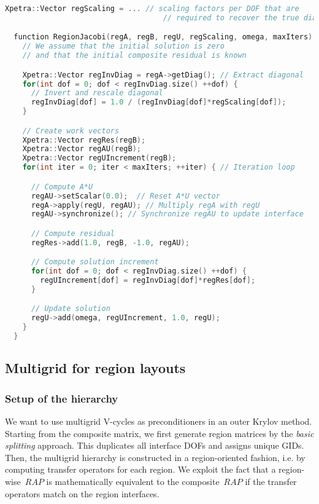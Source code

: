 \documentclass[11pt]{article}
\begin{document}
\begin{lstlisting}[language=c++]
	Xpetra::Vector regScaling = ... // scaling factors per DOF that are
	                                // required to recover the true diagonal

  function RegionJacobi(regA, regB, regU, regScaling, omega, maxIters) {
    // We assume that the initial solution is zero
    // and that the initial composite residual is known

    Xpetra::Vector regInvDiag = regA->getDiag(); // Extract diagonal
    for(int dof = 0; dof < regInvDiag.size() ++dof) {
      // Invert and rescale diagonal
      regInvDiag[dof] = 1.0 / (regInvDiag[dof]*regScaling[dof]);
    }

    // Create work vectors
    Xpetra::Vector regRes(regB);
    Xpetra::Vector regAU(regB);
    Xpetra::Vector regUIncrement(regB);
    for(int iter = 0; iter < maxIters; ++iter) { // Iteration loop

      // Compute A*U
      regAU->setScalar(0.0);  // Reset A*U vector
      regA->apply(regU, regAU); // Multiply regA with regU
      regAU->synchronize(); // Synchronize regAU to update interface

      // Compute residual
      regRes->add(1.0, regB, -1.0, regAU);

      // Compute solution increment
      for(int dof = 0; dof < regInvDiag.size() ++dof) {
        regUIncrement[dof] = regInvDiag[dof]*regRes[dof];
      }

      // Update solution
      regU->add(omega, regUIncrement, 1.0, regU);
    }
  }
\end{lstlisting}

\subsection{Multigrid for region layouts}

\subsubsection{Setup of the hierarchy}

We want to use multigrid V-cycles as preconditioners in an outer Krylov method. Starting from the composite matrix,
we first generate region matrices by the {\em basic splitting} approach.
This duplicates all interface DOFs and assigns unique GIDs.
Then, the multigrid hierarchy is constructed in a region-oriented fashion, i.e. by computing transfer operators for each region.
We exploit the fact that a region-wise~$RAP$ is mathematically equivalent to the composite~$RAP$
if the transfer operators match on the region interfaces.
\end{document}
